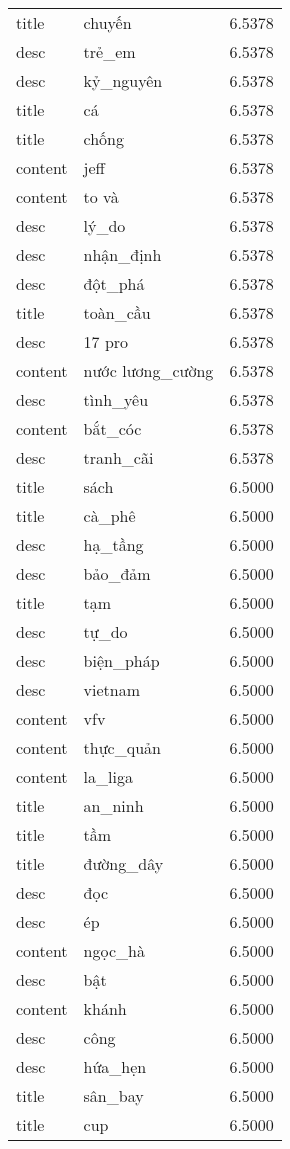 \documentclass{article}
\begin{document}
\begin{tabular}{lll}
title & chuyến & 6.5378\\
desc & trẻ\_em & 6.5378\\
desc & kỷ\_nguyên & 6.5378\\
title & cá & 6.5378\\
title & chống & 6.5378\\
content & jeff & 6.5378\\
content & to và & 6.5378\\
desc & lý\_do & 6.5378\\
desc & nhận\_định & 6.5378\\
desc & đột\_phá & 6.5378\\
title & toàn\_cầu & 6.5378\\
desc & 17 pro & 6.5378\\
content & nước lương\_cường & 6.5378\\
desc & tình\_yêu & 6.5378\\
content & bắt\_cóc & 6.5378\\
desc & tranh\_cãi & 6.5378\\
title & sách & 6.5000\\
title & cà\_phê & 6.5000\\
desc & hạ\_tầng & 6.5000\\
desc & bảo\_đảm & 6.5000\\
title & tạm & 6.5000\\
desc & tự\_do & 6.5000\\
desc & biện\_pháp & 6.5000\\
desc & vietnam & 6.5000\\
content & vfv & 6.5000\\
content & thực\_quản & 6.5000\\
content & la\_liga & 6.5000\\
title & an\_ninh & 6.5000\\
title & tầm & 6.5000\\
title & đường\_dây & 6.5000\\
desc & đọc & 6.5000\\
desc & ép & 6.5000\\
content & ngọc\_hà & 6.5000\\
desc & bật & 6.5000\\
content & khánh & 6.5000\\
desc & công & 6.5000\\
desc & hứa\_hẹn & 6.5000\\
title & sân\_bay & 6.5000\\
title & cup & 6.5000\\

\end{tabular}
\end{document}

